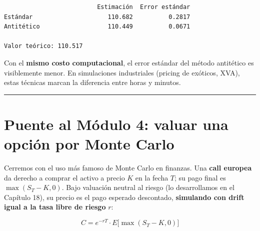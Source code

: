 \documentclass[
  spanish,
  letterpaper,
  DIV=11,
  numbers=noendperiod]{scrreprt}
\begin{document}
\begin{verbatim}
                          Estimación  Error estándar
Estándar                     110.682          0.2817
Antitético                   110.449          0.0671

Valor teórico: 110.517
\end{verbatim}

Con el \textbf{mismo costo computacional}, el error estándar del método
antitético es visiblemente menor. En simulaciones industriales (pricing
de exóticos, XVA), estas técnicas marcan la diferencia entre horas y
minutos.

\begin{center}\rule{0.5\linewidth}{0.5pt}\end{center}

\chapter{Puente al Módulo 4: valuar una opción por Monte
Carlo}\label{puente-al-muxf3dulo-4-valuar-una-opciuxf3n-por-monte-carlo}

Cerremos con el uso más famoso de Monte Carlo en finanzas. Una
\textbf{call europea} da derecho a comprar el activo a precio \(K\) en
la fecha \(T\); su pago final es \(\max(S_T - K, 0)\). Bajo valuación
neutral al riesgo (lo desarrollamos en el Capítulo 18), su precio es el
pago esperado descontado, \textbf{simulando con drift igual a la tasa
libre de riesgo} \(r\):

\[C = e^{-rT} \cdot E\big[\max(S_T - K, 0)\big]\]
\end{document}
